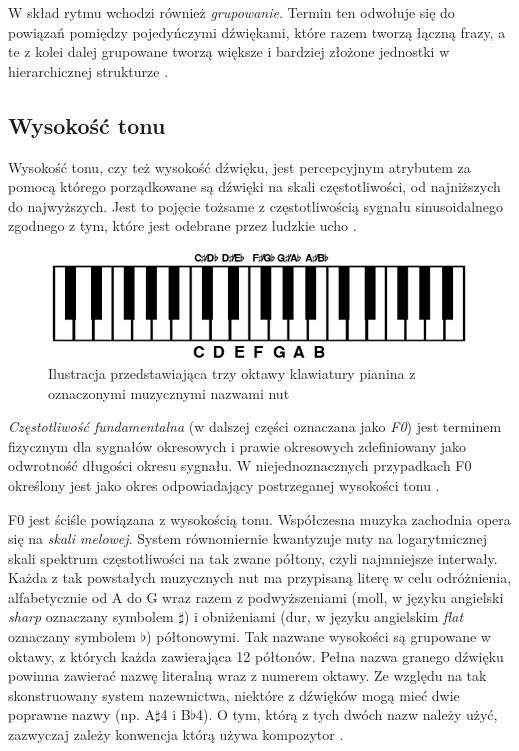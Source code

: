 \documentclass[12pt,a4paper,twoside]{mwart}
\begin{document}
W skład rytmu wchodzi również \textit{grupowanie}. Termin ten odwołuje się do powiązań pomiędzy pojedyńczymi dźwiękami, które razem tworzą łączną frazy, a te z kolei dalej grupowane tworzą większe i bardziej złożone jednostki w hierarchicznej strukturze \cite[12-35]{Transcription:Lerdahl:GenerativeTheory}. 

\subsection{Wysokość tonu}\label{sec:pitch}
Wysokość tonu, czy też wysokość dźwięku, jest percepcyjnym atrybutem za pomocą którego porządkowane są dźwięki na skali częstotliwości, od najniższych do najwyższych. Jest to pojęcie tożsame z częstotliwością sygnału sinusoidalnego zgodnego z tym, które jest odebrane przez ludzkie ucho \cite[3491-3502]{Transcription:Hartmann:PitchPeriodicityAuditoryOrganization}. 

\begin{figure}[H]
  \begin{center}
    \includegraphics[scale=0.5]{images/PianoRoll.png}
    \caption{Ilustracja przedstawiająca trzy oktawy klawiatury pianina z oznaczonymi muzycznymi nazwami nut}
    \label{fig:pianoRoll}
  \end{center}
\end{figure}

\textit{Częstotliwość fundamentalna} (w dalszej części oznaczana jako \textit{F0}) jest terminem fizycznym dla sygnałów okresowych i prawie okresowych zdefiniowany jako odwrotność długości okresu sygnału. W niejednoznacznych przypadkach F0 określony jest jako okres odpowiadający postrzeganej wysokości tonu \cite[8]{Transcription:Anssi:SignalProcessingMethods}.

F0 jest ściśle powiązana z wysokością tonu. Współczesna muzyka zachodnia opera się na \textit{skali melowej}. System równomiernie kwantyzuje nuty na logarytmicznej skali spektrum częstotliwości na tak zwane półtony, czyli najmniejsze interwały. Każda z tak powstałych muzycznych nut ma przypisaną literę w celu odróżnienia, alfabetycznie od A do G wraz razem z podwyższeniami (moll, w języku angielski \textit{sharp} oznaczany symbolem $\sharp$) i obniżeniami (dur, w języku angielskim \textit{flat} oznaczany symbolem $\flat$) półtonowymi. Tak nazwane wysokości są grupowane w oktawy, z których każda zawierająca 12 półtonów. Pełna nazwa granego dźwięku powinna zawierać nazwę literalną wraz z numerem oktawy. Ze względu na tak skonstruowany system nazewnictwa, niektóre z dźwięków mogą mieć dwie poprawne nazwy (np. A$\sharp$4 i B$\flat$4). O tym, którą z tych dwóch nazw należy użyć, zazwyczaj zależy konwencja którą używa kompozytor \cite[215-220]{Transcription:Burns:InversalScalesTuning}.
\end{document}
